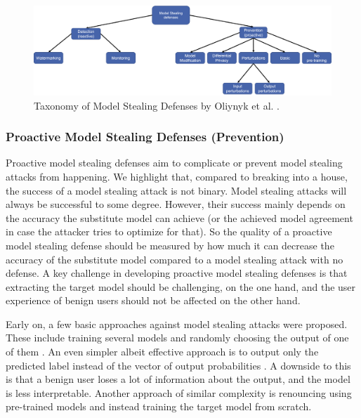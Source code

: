 \begin{figure} [ht]
    \centering
    \includegraphics[width=.9\linewidth]{images/MS_defenses_Taxonomy.png}
    \caption[Model Stealing Defenses Taxonomy]{Taxonomy of Model Stealing Defenses by Oliynyk et al. \cite{oliynyk2022know}.}
    \label{fig:ModelStealingDefenses:Taxonomy}
  \end{figure}

\subsubsection{Proactive Model Stealing Defenses (Prevention)}
\label{sec:ModelStealing:Defenses:Prevention}
Proactive model stealing defenses aim to complicate or prevent model stealing attacks from happening. We highlight that, compared to breaking into a house,
the success of a model stealing attack is not binary. Model stealing attacks will always be successful to some degree. However, their success mainly depends on the accuracy the substitute model
can achieve (or the achieved model agreement in case the attacker tries to optimize for that). So the quality of a proactive model stealing defense should be measured by how much it can 
decrease the accuracy of the substitute model compared to a model stealing attack with no defense. A key challenge in developing proactive model stealing defenses is that
extracting the target model should be challenging, on the one hand,  and the user experience of benign users should not be affected on the other hand. \par
Early on, a few basic approaches against model stealing attacks were proposed. These include training several models and randomly choosing the output of one of them 
\cite{alabdulmohsin2014adding}. An even simpler albeit effective approach is to output only the predicted label instead of the vector of output probabilities \cite{tramer2016stealing}.
A downside to this is that a benign user loses a lot of information about the output, and the model is less interpretable. Another approach of similar complexity is renouncing
using pre-trained models \cite{atli2020extraction} and instead training the target model from scratch. \par
